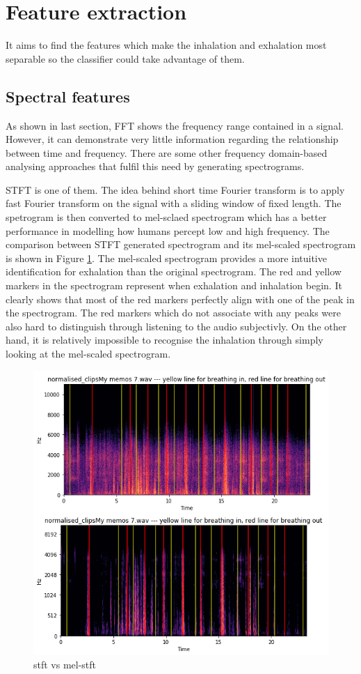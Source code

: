\section{Feature extraction}
It aims to find the features which make the inhalation and exhalation most separable so the classifier could take advantage of them. 

\subsection{Spectral features}
As shown in last section, FFT shows the frequency range contained in a signal. However, it can demonstrate very little information regarding the relationship between time and frequency. There are some other frequency domain-based analysing approaches that fulfil this need by generating spectrograms. 

STFT is one of them. The idea behind short time Fourier transform is to apply fast Fourier transform on the signal with a sliding window of fixed length. The spetrogram is then converted to mel-sclaed spectrogram which has a better performance in modelling how humans percept low and high frequency. The comparison between STFT generated spectrogram and its mel-scaled spectrogram is shown in Figure \ref{fig:stft_mel-stft}. The mel-scaled spectrogram provides a more intuitive identification for exhalation than the original spectrogram. The red and yellow markers in the spectrogram represent when exhalation and inhalation begin. It clearly shows that most of the red markers perfectly align with one of the peak in the spectrogram. The red markers which do not associate with any peaks were also hard to distinguish through listening to the audio subjectivly. On the other hand, it is relatively impossible to recognise the inhalation through simply looking at the mel-scaled spectrogram.

\begin{figure}[h]
    \centerline{\includegraphics[scale=0.6]{figures/stft_mel-stft.png}}
    \caption{stft vs mel-stft}
    \label{fig:stft_mel-stft}
\end{figure}

